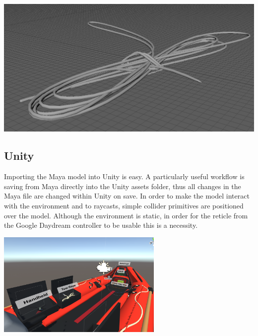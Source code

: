 \documentclass[ %
                    author={Elis Jones},
                supervisor={Dr. Kirsten Cater},
                    degree={BSc},
                     title={The Effect of Presentation Medium on Spatial Cognition},
                  subtitle={in the Virtual Environment},
                      year={2018} ]{dissertation}
\begin{document}
\begin{minipage}{\textwidth}
\begin{center}
\begin{minipage}{0.18\textwidth}
    \end{minipage}\hfill
    \begin{minipage}{0.18\textwidth}
        \centering
        \includegraphics[width=1\textwidth]{images/towdivisions.png}
    \end{minipage}\hfill
\end{center}
\label{tow}
\end{minipage}

\subsection{Unity}
Importing the Maya model into Unity is easy. A particularly useful workflow is saving from Maya directly into the Unity assets folder, thus all changes in the Maya file are changed within Unity on save. In order to make the model interact with the environment and to raycasts, simple collider primitives are positioned over the model. Although the environment is static, in order for the reticle from the Google Daydream controller to be usable this is a necessity.  

\begin{minipage}{\textwidth}
\hfill \break
\centering
\includegraphics[width=0.6\textwidth]{images/model_unity}
\label{model}
\hfill \break
\end{minipage}
\end{document}
